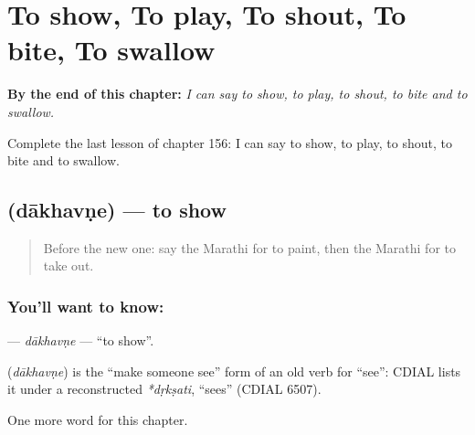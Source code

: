 
\chapter{To show, To play, To shout, To bite, To swallow}
\label{ch:mr-to-show-to-play-to-shout-to-bite-to-swallow}

\begin{chapteropening}
\textbf{By the end of this chapter:} \emph{I can say to show, to play, to shout, to bite and to swallow.}

Complete the last lesson of chapter 156: I can say to show, to play, to shout, to bite and to swallow.
\end{chapteropening}

\section[\texorpdfstring{\mr{दाखवणे} (dākhavṇe)}{दाखवणे (dākhavṇe)}]{ (dākhavṇe) — to show}

\label{lesson:MR-C156-dakhavne}



\begin{quote}
Before the new one: say the Marathi for to paint, then the Marathi for to take out.
\end{quote}

\subsection*{You'll want to know: }
\textbf{} — \emph{dākhavṇe} — \textquotedblleft{}to show\textquotedblright{}.

\begin{cousinweb}
\textbf{} (\emph{dākhavṇe}) is the \textquotedblleft{}make someone see\textquotedblright{} form of an old verb for \textquotedblleft{}see\textquotedblright{}: CDIAL lists it under a reconstructed \emph{*dṛkṣati}, \textquotedblleft{}sees\textquotedblright{} (CDIAL 6507).
\end{cousinweb}

\begin{grammarlens}[title={What you've built}]
One more word for this chapter.
\end{grammarlens}

